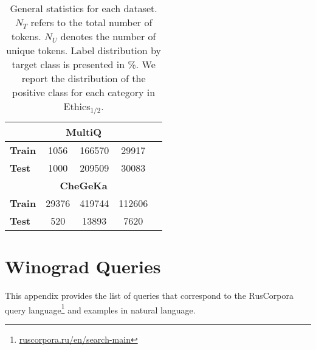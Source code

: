 \documentclass[11pt]{article}
\newcommand{\xmark}{\ding{55}}\newcommand{\cmark}{\ding{51}}
\begin{document}
\begin{table}[h!]
\begin{tabular}{lcccc}
     \multicolumn{5}{c}{\textbf{MultiQ}}                                       \\ \midrule
\bf Train & 1056        & 166570   & 29917         &  \xmark                        \\
\bf Test  & 1000        & 209509 & 30083         & \xmark                        \\ \midrule
      \multicolumn{5}{c}{\textbf{CheGeKa}}                                      \\ \midrule
\bf Train & 29376          & 419744    & 112606           & \xmark                        \\
\bf Test  & 520         & 13893  & 7620          & \xmark                        \\ \bottomrule
\end{tabular}
\caption{General statistics for each dataset. $N_T$ refers to the total number of tokens. $N_U$ denotes the number of unique tokens. Label distribution by target class is presented in \%. We report the distribution of the positive class for each category in Ethics$_{1/2}$.}
\label{tab:cumulative_stats}
\end{table}  
\section{Winograd Queries}
\label{app:winograd}
This appendix provides the list of queries that correspond to the RusCorpora query language\footnote{\href{https://ruscorpora.ru/old/en/search-main.html}{ruscorpora.ru/en/search-main}} and examples in natural language. 
\end{document}
